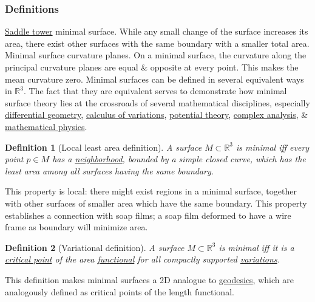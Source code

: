 \documentclass{article}
\newtheorem{definition}{Definition}
\begin{document}
\subsubsection{Definitions}
{\sf\href{https://en.wikipedia.org/wiki/Saddle_tower}{Saddle tower} minimal surface. While any small change of the surface increases its area, there exist other surfaces with the same boundary with a smaller total area.} {\sf Minimal surface curvature planes. On a minimal surface, the curvature along the principal curvature planes are equal \& opposite at every point. This makes the mean curvature zero.} Minimal surfaces can be defined in several equivalent ways in $\mathbb{R}^3$. The fact that they are equivalent serves to demonstrate how minimal surface theory lies at the crossroads of several mathematical disciplines, especially \href{https://en.wikipedia.org/wiki/Differential_geometry}{differential geometry}, \href{https://en.wikipedia.org/wiki/Calculus_of_variations}{calculus of variations}, \href{https://en.wikipedia.org/wiki/Potential_theory}{potential theory}, \href{https://en.wikipedia.org/wiki/Complex_analysis}{complex analysis}, \& \href{https://en.wikipedia.org/wiki/Mathematical_physics}{mathematical physics}.

\begin{definition}[Local least area definition]
	A surface $M\subset\mathbb{R}^3$ is minimal iff every point $p\in M$ has a \href{https://en.wikipedia.org/wiki/Neighbourhood_(topology)}{neighborhood}, bounded by a simple closed curve, which has the least area among all surfaces having the same boundary.
\end{definition}
This property is local: there might exist regions in a minimal surface, together with other surfaces of smaller area which have the same boundary. This property establishes a connection with soap films; a soap film deformed to have a wire frame as boundary will minimize area.

\begin{definition}[Variational definition]
	A surface $M\subset\mathbb{R}^3$ is minimal iff it is a \href{https://en.wikipedia.org/wiki/Critical_point_(mathematics)}{critical point} of the area \href{https://en.wikipedia.org/wiki/Functional_(mathematics)}{functional} for all compactly supported \href{https://en.wikipedia.org/wiki/Calculus_of_variations}{variations}.
\end{definition}
This definition makes minimal surfaces a 2D analogue to \href{https://en.wikipedia.org/wiki/Geodesics}{geodesics}, which are analogously defined as critical points of the length functional.
\end{document}
